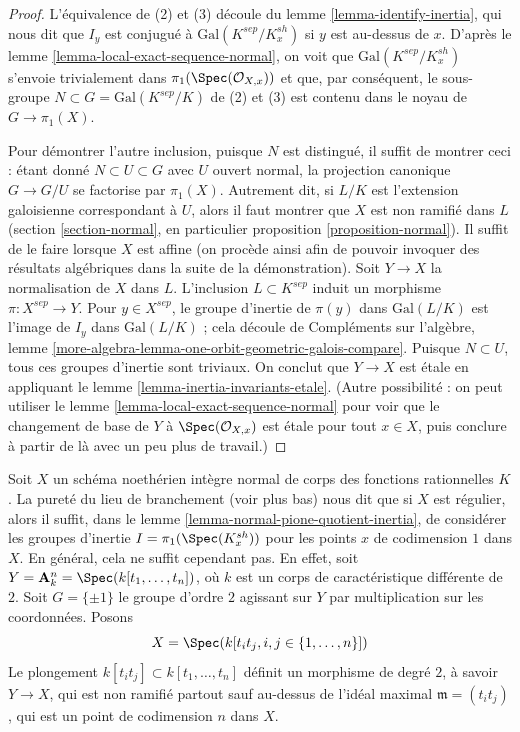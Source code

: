 \begin{proof}
L'équivalence de (2) et (3) découle du
lemme \ref{lemma-identify-inertia},
qui nous dit que $I_y$ est conjugué à $\text{Gal}(K^{sep}/K_x^{sh})$
si $y$ est au-dessus de $x$. D'après le lemme \ref{lemma-local-exact-sequence-normal},
on voit que $\text{Gal}(K^{sep}/K_x^{sh})$ s'envoie trivialement dans
$\pi_1(\Spec(\mathcal{O}_{X, x}))$ et que, par conséquent, le sous-groupe
$N \subset G = \text{Gal}(K^{sep}/K)$
de (2) et (3) est contenu dans le noyau de
$G \longrightarrow \pi_1(X)$.

\medskip\noindent
Pour démontrer l'autre inclusion, puisque $N$ est distingué, il suffit de montrer ceci :
étant donné $N \subset U \subset G$ avec $U$ ouvert normal,
la projection canonique $G \to G/U$ se factorise par $\pi_1(X)$.
Autrement dit, si $L/K$ est l'extension galoisienne correspondant
à $U$, alors il faut montrer que $X$ est non ramifié dans $L$
(section \ref{section-normal}, en particulier
proposition \ref{proposition-normal}).
Il suffit de le faire lorsque $X$ est affine (on procède ainsi
afin de pouvoir invoquer des résultats algébriques dans la suite de la démonstration).
Soit $Y \to X$ la normalisation de $X$ dans $L$.
L'inclusion $L \subset K^{sep}$ induit un morphisme
$\pi : X^{sep} \to Y$. Pour $y \in X^{sep}$,
le groupe d'inertie de $\pi(y)$ dans $\text{Gal}(L/K)$
est l'image de $I_y$ dans $\text{Gal}(L/K)$ ; cela découle
de Compléments sur l'algèbre, lemme
\ref{more-algebra-lemma-one-orbit-geometric-galois-compare}.
Puisque $N \subset U$, tous ces groupes d'inertie sont triviaux.
On conclut que $Y \to X$ est étale en appliquant le
lemme \ref{lemma-inertia-invariants-etale}.
(Autre possibilité : on peut utiliser le lemme \ref{lemma-local-exact-sequence-normal}
pour voir que le changement de base de $Y$ à $\Spec(\mathcal{O}_{X, x})$ est
étale pour tout $x \in X$, puis conclure à partir de là
avec un peu plus de travail.)
\end{proof}

\begin{example}
\label{example-bigger-codim}
Soit $X$ un schéma noethérien intègre normal de corps des fonctions rationnelles $K$.
La pureté du lieu de branchement (voir plus bas) nous dit que si $X$ est régulier, alors
il suffit, dans le lemme \ref{lemma-normal-pione-quotient-inertia},
de considérer les groupes d'inertie $I = \pi_1(\Spec(K_x^{sh}))$
pour les points $x$ de codimension $1$ dans $X$.
En général, cela ne suffit cependant pas. En effet, soit
$Y = \mathbf{A}_k^n = \Spec(k[t_1, \ldots, t_n])$,
où $k$ est un corps de caractéristique différente de $2$.
Soit $G = \{\pm 1\}$ le groupe d'ordre $2$ agissant sur $Y$
par multiplication sur les coordonnées. Posons
$$
X = \Spec(k[t_it_j, i, j \in \{1, \ldots, n\}])
$$
Le plongement $k[t_it_j] \subset k[t_1, \ldots, t_n]$
définit un morphisme de degré $2$, à savoir $Y \to X$, qui est non ramifié partout
sauf au-dessus de l'idéal maximal $\mathfrak m = (t_it_j)$,
qui est un point de codimension $n$ dans $X$.
\end{example}


